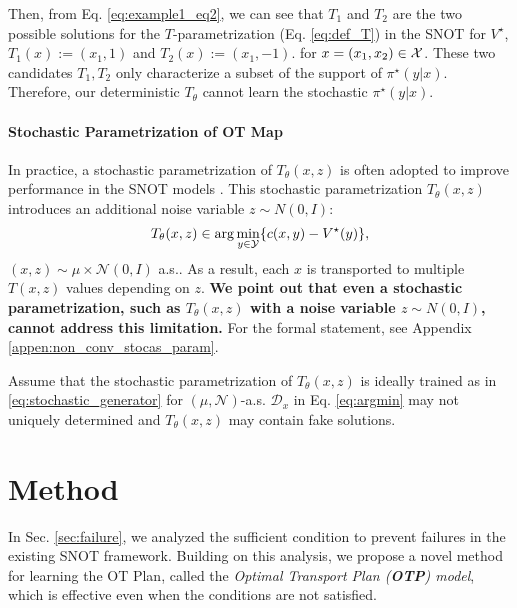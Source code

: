 Then, from Eq. \ref{eq:example1_eq2}, we can see that $T_1$ and $T_2$ are the two possible solutions for the $T$-parametrization (Eq. \ref{eq:def_T}) in the SNOT for $V^{\star}$, 
    $T_1(x):=(x_1,1)$ and $T_2(x):=(x_1,-1).$
for $x=(x_1, x_2) \in {\mathcal{X}}$. These two candidates $T_{1}, T_{2}$ only characterize a subset of the support of $\pi^{\star} (y|x)$. Therefore, our deterministic $T_{\theta}$ cannot learn the stochastic $\pi^{\star} (y|x)$. 

\paragraph{Stochastic Parametrization of OT Map} In practice, a stochastic parametrization of $T_{\theta}(x, z)$ is often adopted to improve performance in the SNOT models \citep{not, uotm}. This stochastic parametrization $T_{\theta}(x, z)$ introduces an additional noise variable $z \sim N(0, I)$: 
\vspace{-10pt}
\begin{equation} \label{eq:stochastic_generator} 
    T_{\theta}(x, z) \in \arg\min_{y\in \mathcal{Y}} \{ c(x,y) - V^\star (y) \}, \\[-5pt]
\end{equation}
$(x,z)\sim \mu \times \mathcal{N}(0,I)$ a.s.. As a result, each $x$ is transported to multiple $T(x, z)$ values depending on $z$. \textbf{We point out that even a stochastic parametrization, such as $T_{\theta}(x, z)$ with a noise variable $z \sim N(0, I)$, cannot address this limitation.} For the formal statement, see Appendix \ref{appen:non_conv_stocas_param}.


\begin{proposition}[Informal]
\label{prop:stoc}
    Assume that the stochastic parametrization of $T_{\theta}(x, z)$ is ideally trained as in \eqref{eq:stochastic_generator} for $(\mu, \mathcal{N})$-a.s. $\mathcal{D}_x$ in Eq. \ref{eq:argmin} may not uniquely determined %
    and $T_{\theta}(x, z)$ may contain fake solutions.
\end{proposition}

    


    
\section{Method} \label{sec:method}
In Sec. \ref{sec:failure}, we analyzed the sufficient condition to prevent failures in the existing SNOT framework. Building on this analysis, we propose a novel method for learning the OT Plan, called the \textit{Optimal Transport Plan (\textbf{OTP}) model}, which is effective even when the conditions are not satisfied.


